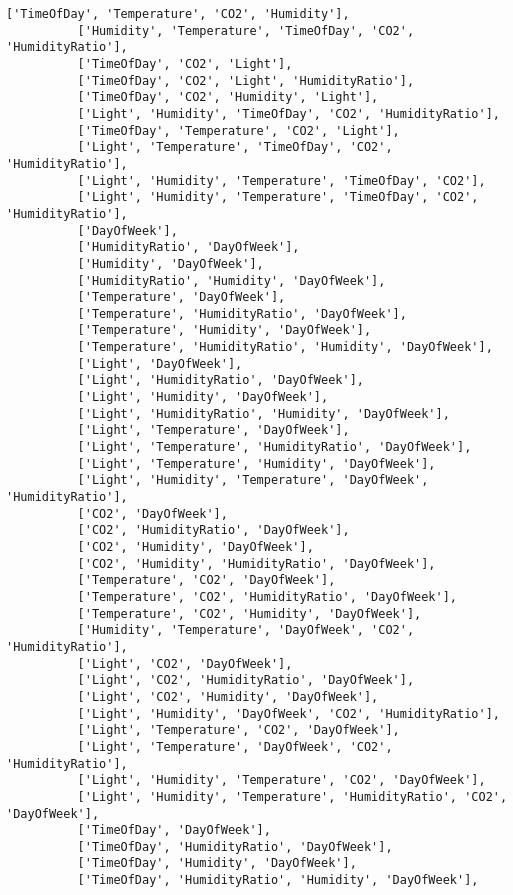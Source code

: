\documentclass[11pt]{article}
\begin{document}
\begin{Verbatim}[commandchars=\\\{\}]
          ['TimeOfDay', 'Temperature', 'CO2', 'Humidity'],
          ['Humidity', 'Temperature', 'TimeOfDay', 'CO2', 'HumidityRatio'],
          ['TimeOfDay', 'CO2', 'Light'],
          ['TimeOfDay', 'CO2', 'Light', 'HumidityRatio'],
          ['TimeOfDay', 'CO2', 'Humidity', 'Light'],
          ['Light', 'Humidity', 'TimeOfDay', 'CO2', 'HumidityRatio'],
          ['TimeOfDay', 'Temperature', 'CO2', 'Light'],
          ['Light', 'Temperature', 'TimeOfDay', 'CO2', 'HumidityRatio'],
          ['Light', 'Humidity', 'Temperature', 'TimeOfDay', 'CO2'],
          ['Light', 'Humidity', 'Temperature', 'TimeOfDay', 'CO2', 'HumidityRatio'],
          ['DayOfWeek'],
          ['HumidityRatio', 'DayOfWeek'],
          ['Humidity', 'DayOfWeek'],
          ['HumidityRatio', 'Humidity', 'DayOfWeek'],
          ['Temperature', 'DayOfWeek'],
          ['Temperature', 'HumidityRatio', 'DayOfWeek'],
          ['Temperature', 'Humidity', 'DayOfWeek'],
          ['Temperature', 'HumidityRatio', 'Humidity', 'DayOfWeek'],
          ['Light', 'DayOfWeek'],
          ['Light', 'HumidityRatio', 'DayOfWeek'],
          ['Light', 'Humidity', 'DayOfWeek'],
          ['Light', 'HumidityRatio', 'Humidity', 'DayOfWeek'],
          ['Light', 'Temperature', 'DayOfWeek'],
          ['Light', 'Temperature', 'HumidityRatio', 'DayOfWeek'],
          ['Light', 'Temperature', 'Humidity', 'DayOfWeek'],
          ['Light', 'Humidity', 'Temperature', 'DayOfWeek', 'HumidityRatio'],
          ['CO2', 'DayOfWeek'],
          ['CO2', 'HumidityRatio', 'DayOfWeek'],
          ['CO2', 'Humidity', 'DayOfWeek'],
          ['CO2', 'Humidity', 'HumidityRatio', 'DayOfWeek'],
          ['Temperature', 'CO2', 'DayOfWeek'],
          ['Temperature', 'CO2', 'HumidityRatio', 'DayOfWeek'],
          ['Temperature', 'CO2', 'Humidity', 'DayOfWeek'],
          ['Humidity', 'Temperature', 'DayOfWeek', 'CO2', 'HumidityRatio'],
          ['Light', 'CO2', 'DayOfWeek'],
          ['Light', 'CO2', 'HumidityRatio', 'DayOfWeek'],
          ['Light', 'CO2', 'Humidity', 'DayOfWeek'],
          ['Light', 'Humidity', 'DayOfWeek', 'CO2', 'HumidityRatio'],
          ['Light', 'Temperature', 'CO2', 'DayOfWeek'],
          ['Light', 'Temperature', 'DayOfWeek', 'CO2', 'HumidityRatio'],
          ['Light', 'Humidity', 'Temperature', 'CO2', 'DayOfWeek'],
          ['Light', 'Humidity', 'Temperature', 'HumidityRatio', 'CO2', 'DayOfWeek'],
          ['TimeOfDay', 'DayOfWeek'],
          ['TimeOfDay', 'HumidityRatio', 'DayOfWeek'],
          ['TimeOfDay', 'Humidity', 'DayOfWeek'],
          ['TimeOfDay', 'HumidityRatio', 'Humidity', 'DayOfWeek'],

\end{Verbatim}
\end{document}
